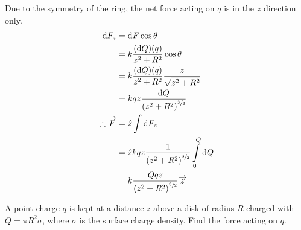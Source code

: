 \documentclass[fleqn, a4paper, 12pt, twoside]{article}
\theoremstyle{definition}
\theoremstyle{theorem}
\begin{document}
\begin{solution}
	\begin{figure}[H]
	\end{figure}
	Due to the symmetry of the ring, the net force acting on $q$ is in the $z$ direction only.
	\begin{align*}
		\dif F_z &= \dif F \cos \theta\\
		&= k \dfrac{(\dif Q) (q)}{z^2 + R^2} \cos \theta\\
		&= k \dfrac{(\dif Q) (q)}{z^2 + R^2} \dfrac{z}{\sqrt{z^2 + R^2}}\\
		&= k q z \dfrac{\dif Q}{\left( z^2 + R^2 \right)^{\sfrac{3}{2}}}\\
		\therefore \overrightarrow{F} &= \hat{z} \int \dif F_z\\
		&= \hat{z} k q z \dfrac{1}{\left( z^2 + R^2 \right)^{\sfrac{3}{2}}} \int\limits_{0}^{Q} \dif Q\\
		&= k \dfrac{Q q z}{\left( z^2 + R^2 \right)^{\sfrac{3}{2}}} \overrightarrow{z}
	\end{align*}
\end{solution}

\begin{question}
	A point charge $q$ is kept at a distance $z$ above a disk of radius $R$ charged with $Q = \pi R^2 \sigma$, where $\sigma$ is the surface charge density. Find the force acting on $q$.
\end{question}
\end{document}
